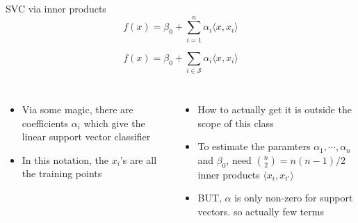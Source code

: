 \documentclass[aspectratio=169,usenames,dvipsnames]{beamer}
\newcommand{\InstructorList}[1]{
\begin{itemize}
	\color{orange}
	#1
\end{itemize}
}
\begin{document}
\begin{frame}[t]{SVC via inner products}
	\centering
\begin{equation*}
	f(x) = \beta_0 + \sum_{i=1}^n \alpha_i \langle x, x_i \rangle
\end{equation*}

\begin{equation*}
	f(x) = \beta_0 + \sum_{i\in\mathcal{S}} \alpha_i \langle x, x_i \rangle
\end{equation*}

\begin{columns}
\centering

\InstructorList{
	\item Via some magic, there are coefficients $\alpha_i$ which give the linear support vector classifier 
	\item In this notation, the $x_i$'s are all the training points 
}

\centering
\InstructorList{
  \item How to actually get it is outside the scope of this class
  \item To estimate the paramters $\alpha_1,\cdots,\alpha_n$ and $\beta_0$, need $\binom{n}{2} = n(n-1)/2$ inner products $\langle x_i,x_{i'} \rangle$
  \item BUT, $\alpha$ is only non-zero for support vectors. so actually few terms
}


\end{columns}

\end{frame}
\end{document}
